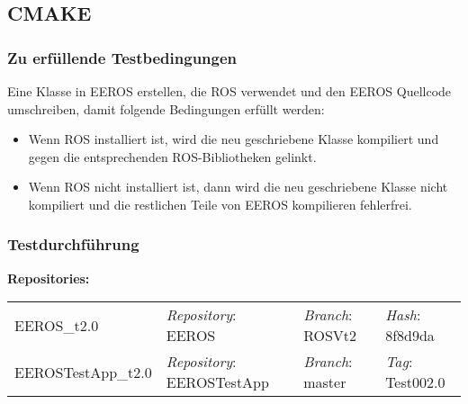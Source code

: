 \subsection{CMAKE}
\subsubsection{Zu erfüllende Testbedingungen}
Eine Klasse in EEROS erstellen, die ROS verwendet und den EEROS Quellcode umschreiben, damit folgende Bedingungen erfüllt werden:
\begin{itemize}
\item Wenn ROS installiert ist, wird die neu geschriebene Klasse kompiliert und gegen die entsprechenden ROS-Bibliotheken gelinkt.
\item Wenn ROS nicht installiert ist, dann wird die neu geschriebene Klasse nicht kompiliert und die restlichen Teile von EEROS kompilieren fehlerfrei.
\end{itemize}

\subsubsection{Testdurchführung}
\textbf{Repositories:} \\
\begin{tabular}
  { l						| l			 							l								 l								}

  EEROS\_t2.0				& \textit{Repository}: EEROS			& \textit{Branch}: ROSVt2		& \textit{Hash}: 8f8d9da		\\
  EEROSTestApp\_t2.0		& \textit{Repository}: EEROSTestApp	& \textit{Branch}: master		& \textit{Tag}: Test002.0 		\\
\end{tabular}

